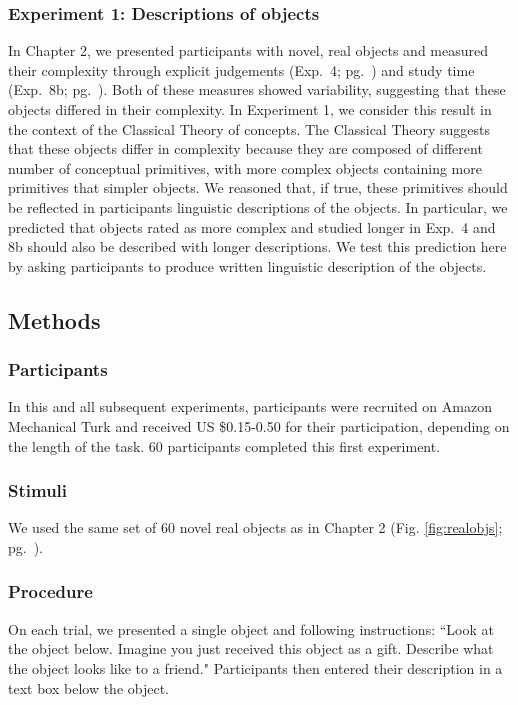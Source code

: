 \subsubsection{Experiment 1: Descriptions of objects}
In Chapter 2, we presented participants with novel, real objects and measured their complexity through explicit judgements (Exp.\ 4; pg.\ \pageref{ch2-4}) and study time (Exp.\ 8b; pg.\ \pageref{ch2-8b}). Both of these measures showed variability, suggesting that these objects differed in their complexity. 
In Experiment 1, we consider this result in the context of the Classical Theory of concepts. The Classical Theory suggests that these objects differ in complexity because they are composed of different number of conceptual primitives, with more complex objects containing more primitives that simpler objects. We reasoned that, if true, these primitives should be reflected in participants linguistic descriptions of the objects. In particular, we predicted that objects rated as more complex and studied longer in Exp.\ 4 and 8b should also be described with longer descriptions. We test this prediction here by asking participants to produce written linguistic description of the objects.


\subsection{Methods}
\subsubsection{Participants} 
In this and all subsequent experiments, participants were recruited on Amazon Mechanical Turk and received US \$0.15-0.50 for their participation, depending on the length of the task. 60 participants completed this first experiment.
\subsubsection{Stimuli} 
We used the same set of 60 novel real objects as in Chapter 2 (Fig. \ref{fig:realobjs}; pg.\ \pageref{fig:realobjs}).

\subsubsection{Procedure}
On each trial, we presented a single object and following instructions:  ``Look at the object below. Imagine you just received this object as a gift. Describe what the object looks like to a friend." Participants then entered their description in a text box below the object.

